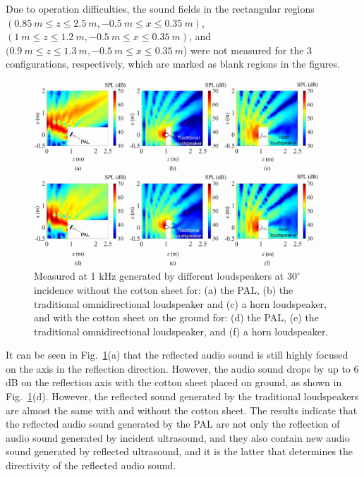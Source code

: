 Due to operation difficulties, 
the sound fields in the rectangular regions $(\SI{0.85}{m} \leq z \leq \SI{2.5}{m}, \SI{-0.5}{m} \leq x \leq \SI{0.35}{m})$, $(\SI{1}{m}\leq  z \leq \SI{1.2}{m}, \SI{-0.5 }{m} \leq x \leq\SI {0.35 }{m})$, and $(\SI{0.9 }{m} \leq z \leq \SI{1.3 }{m}, \SI{-0.5 }{m} \leq x \leq\SI{ 0.35}{ m}$) were not measured for the 3 configurations, respectively, which are marked as blank regions in the figures.
\begin{figure}[!htb]
    \centering
    \includegraphics[width = 0.95\textwidth]{Figures/pending/AllExperimentalResults-Resize.jpg}
    \caption{Measured  at 1 kHz generated by different loudspeakers at $30^\circ$ incidence without the cotton sheet for: (a) the PAL, (b) the traditional omnidirectional loudspeaker and (c) a horn loudspeaker, and with the cotton sheet on the ground for: (d) the PAL, (e) the traditional omnidirectional loudspeaker, and (f) a horn loudspeaker.}
    \label{fig:reflection:exp:results}
\end{figure}
It can be seen in Fig.~\ref{fig:reflection:exp:results}(a) that the reflected audio sound is still highly focused on the axis in the reflection direction.
However, the audio sound drops by up to 6 dB on the reflection axis with the cotton sheet placed on ground, as shown in Fig.~{\ref{fig:reflection:exp:results}}(d). 
However, the reflected sound generated by the traditional loudspeakers are almost the same with and without the cotton sheet. The results indicate that the reflected audio sound generated by the PAL are not only the reflection of audio sound generated by incident ultrasound, and they also contain new audio sound generated by reflected ultrasound, and it is the latter that determines the directivity of the reflected audio sound.


